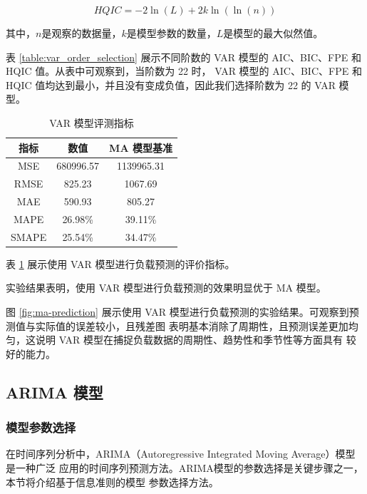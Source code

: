 \documentclass[a4paper,AutoFakeBold,oneside,12pt]{book}
\begin{document}
\[ HQIC = -2\ln(L) + 2k\ln(\ln(n)) \]

其中，$n$是观察的数据量，$k$是模型参数的数量，$L$是模型的最大似然值。

表 \ref{table:var_order_selection} 
展示不同阶数的 VAR 模型的 AIC、BIC、FPE 和 HQIC 值。从表中可观察到，当阶数为 22 时，
VAR 模型的 AIC、BIC、FPE 和 HQIC 值均达到最小，并且没有变成负值，因此我们选择阶数为 22 的 VAR 模型。


\begin{table}[tbp]
	\centering
	\caption{VAR 模型评测指标}
	\label{table:var_regression_metrics}
	\begin{tabular}{c|c|c}
	\hline
	\textbf{指标} & \textbf{数值} & \textbf{MA 模型基准}\\
	\hline
	MSE & 680996.57 & 1139965.31 \\
	RMSE & 825.23 & 1067.69 \\
	MAE & 590.93 & 805.27 \\
	MAPE & 26.98\% & 39.11\% \\
	SMAPE & 25.54\% & 34.47\% \\
	
	\hline
	\end{tabular}
	\end{table}

表 \ref{table:var_regression_metrics} 展示使用 VAR 模型进行负载预测的评价指标。

实验结果表明，使用 VAR 模型进行负载预测的效果明显优于 MA 模型。



图 \ref{fig:ma-prediction} 展示使用 VAR 模型进行负载预测的实验结果。可观察到预测值与实际值的误差较小，且残差图
表明基本消除了周期性，且预测误差更加均匀，这说明 VAR 模型在捕捉负载数据的周期性、趋势性和季节性等方面具有
较好的能力。


\subsection{ARIMA 模型}

\subsubsection{模型参数选择}

在时间序列分析中，ARIMA（Autoregressive Integrated Moving Average）模型是一种广泛
应用的时间序列预测方法。ARIMA模型的参数选择是关键步骤之一，本节将介绍基于信息准则的模型
参数选择方法。
\end{document}
